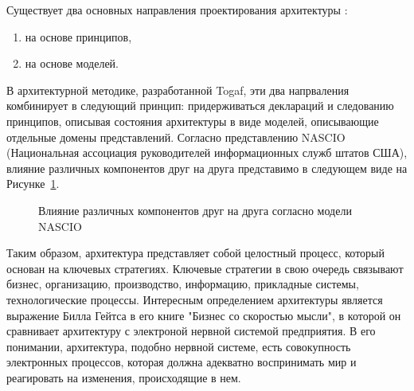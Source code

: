 Существует два основных направления проектирования архитектуры : 
\begin{enumerate}
	\item на основе принципов,
	\item на основе моделей.
\end{enumerate}

В архитектурной методике, разработанной Togaf\cite{Togaf}, эти два напрваления комбинирует в следующий принцип: придерживаться деклараций и следованию принципов, описывая состояния архитектуры в виде моделей, описывающие отдельные домены представлений.
Согласно представлению NASCIO (Национальная ассоциация руководителей информационных служб штатов США), влияние различных компонентов друг на друга представимо в следующем виде на Рисунке~\cref{fig:NASCIO}.
\begin{figure}[ht1]
    \caption{Влияние различных компонентов друг на друга согласно модели NASCIO}\label{fig:NASCIO}
\end{figure}

Таким образом, архитектура представляет собой целостный процесс, который основан на ключевых стратегиях. Ключевые стратегии в свою очередь связывают бизнес, организацию, производство, информацию, прикладные системы, технологические процессы.
Интересным определением архитектуры является выражение Билла Гейтса в его книге "Бизнес со скоростью мысли", в которой он сравнивает архитектуру с электроной нервной системой предприятия. В его понимании, архитектура, подобно нервной системе, есть совокупность электронных процессов, которая должна адекватно воспринимать мир и реагировать на изменения, происходящие в нем.  

